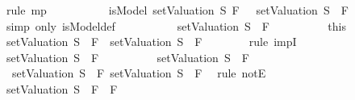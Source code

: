\begin{isabellebody}
\ {\isacharparenleft}rule\ mp{\isacharparenright}\isanewline
\ \ \ \ \ \ \isamarkupfalse%
\ \isamarkupfalse%
\ {\isachardoublequoteopen}{\isacharparenleft}{\isasymnot}\ isModel\ {\isacharparenleft}setValuation\ S{\isacharparenright}\ F{}{\isacharparenright}\ {\isacharequal}\ {\isacharparenleft}{\isasymnot}\ {\isacharparenleft}setValuation\ S{\isacharparenright}\ {\isasymTurnstile}\ F{}{\isacharparenright}{\isachardoublequoteclose}\isanewline
\ \ \ \ \ \ \ \ \isamarkupfalse%
\ {\isacharparenleft}simp\ only{\isacharcolon}\ isModel{\isacharunderscore}def{\isacharparenright}\isanewline
\ \ \ \ \ \ \isamarkupfalse%
\ \isamarkupfalse%
\ {\isachardoublequoteopen}{\isasymnot}\ {\isacharparenleft}setValuation\ S{\isacharparenright}\ {\isasymTurnstile}\ F{}{\isachardoublequoteclose}\isanewline
\ \ \ \ \ \ \ \ \isamarkupfalse%
\ this\isanewline
\ \ \ \ \ \ \isamarkupfalse%
\ {\isachardoublequoteopen}{\isacharparenleft}setValuation\ S{\isacharparenright}\ {\isasymTurnstile}\ F{}\ {\isasymlongrightarrow}\ {\isacharparenleft}setValuation\ S{\isacharparenright}\ {\isasymTurnstile}\ F{}{\isachardoublequoteclose}\isanewline
\ \ \ \ \ \ \isamarkupfalse%
\ {\isacharparenleft}rule\ impI{\isacharparenright}\isanewline
\ \ \ \ \ \ \ \ \isamarkupfalse%
\ {\isachardoublequoteopen}{\isacharparenleft}setValuation\ S{\isacharparenright}\ {\isasymTurnstile}\ F{}{\isachardoublequoteclose}\isanewline
\ \ \ \ \ \ \ \ \isamarkupfalse%
\ {\isachardoublequoteopen}{\isacharparenleft}setValuation\ S{\isacharparenright}\ {\isasymTurnstile}\ F{}{\isachardoublequoteclose}\isanewline
\ \ \ \ \ \ \ \ \ \ \isamarkupfalse%
\ {\isacartoucheopen}{\isasymnot}\ {\isacharparenleft}setValuation\ S{\isacharparenright}\ {\isasymTurnstile}\ F{}{\isacartoucheclose}\ {\isacartoucheopen}{\isacharparenleft}setValuation\ S{\isacharparenright}\ {\isasymTurnstile}\ F{}{\isacartoucheclose}\ \isamarkupfalse%
\ {\isacharparenleft}rule\ notE{\isacharparenright}\ \isanewline
\ \ \ \ \ \ \isamarkupfalse%
\isanewline
\ \ \ \ \ \ \isamarkupfalse%
\ \isamarkupfalse%
\ {\isachardoublequoteopen}{\isacharparenleft}setValuation\ S{\isacharparenright}\ {\isasymTurnstile}\ {\isacharparenleft}F{}\ \isactrlbold {\isasymrightarrow}\ F{}{\isacharparenright}{\isachardoublequoteclose}\isanewline

\end{isabellebody}

